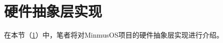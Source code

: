 \section{硬件抽象层实现}\label{sec:HardwareAbstractionLayerImplementation}

在本节（\cref{sec:HardwareAbstractionLayerImplementation}）中，笔者将对MinmusOS项目的硬件抽象层实现进行介绍。